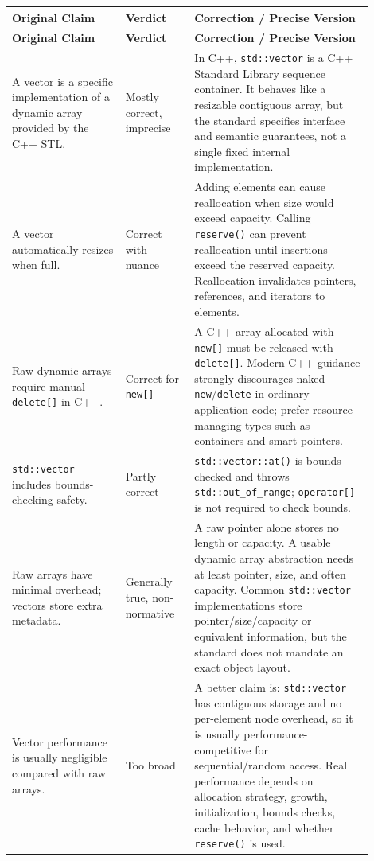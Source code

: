 \documentclass[11pt]{article}
\begin{document}
\begin{longtable}{>{\raggedright\arraybackslash}p{0.29\linewidth}>{\raggedright\arraybackslash}p{0.17\linewidth}>{\raggedright\arraybackslash}p{0.44\linewidth}}
\toprule
\textbf{Original Claim} & \textbf{Verdict} & \textbf{Correction / Precise Version} \\
\midrule
\endfirsthead
\toprule
\textbf{Original Claim} & \textbf{Verdict} & \textbf{Correction / Precise Version} \\
\midrule
\endhead
A vector is a specific implementation of a dynamic array provided by the C++ STL. & Mostly correct, imprecise & In C++, \texttt{std::vector} is a C++ Standard Library sequence container. It behaves like a resizable contiguous array, but the standard specifies interface and semantic guarantees, not a single fixed internal implementation. \cite{cppref-vector} \\
\addlinespace
A vector automatically resizes when full. & Correct with nuance & Adding elements can cause reallocation when size would exceed capacity. Calling \texttt{reserve()} can prevent reallocation until insertions exceed the reserved capacity. Reallocation invalidates pointers, references, and iterators to elements. \cite{cppref-reserve} \\
\addlinespace
Raw dynamic arrays require manual \texttt{delete[]} in C++. & Correct for \texttt{new[]} & A C++ array allocated with \texttt{new[]} must be released with \texttt{delete[]}. Modern C++ guidance strongly discourages naked \texttt{new}/\texttt{delete} in ordinary application code; prefer resource-managing types such as containers and smart pointers. \cite{cpp-core-guidelines} \\
\addlinespace
\texttt{std::vector} includes bounds-checking safety. & Partly correct & \texttt{std::vector::at()} is bounds-checked and throws \texttt{std::out\_of\_range}; \texttt{operator[]} is not required to check bounds. \cite{cppref-at} \\
\addlinespace
Raw arrays have minimal overhead; vectors store extra metadata. & Generally true, non-normative & A raw pointer alone stores no length or capacity. A usable dynamic array abstraction needs at least pointer, size, and often capacity. Common \texttt{std::vector} implementations store pointer/size/capacity or equivalent information, but the standard does not mandate an exact object layout. \\
\addlinespace
Vector performance is usually negligible compared with raw arrays. & Too broad & A better claim is: \texttt{std::vector} has contiguous storage and no per-element node overhead, so it is usually performance-competitive for sequential/random access. Real performance depends on allocation strategy, growth, initialization, bounds checks, cache behavior, and whether \texttt{reserve()} is used. \cite{cpp-core-guidelines} \\

\end{longtable}
\end{document}
